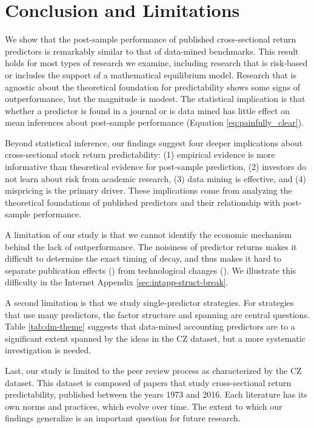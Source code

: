 \section{Conclusion and Limitations}\label{sec:conclusion}

We show that the post-sample performance of published cross-sectional return predictors is remarkably similar to that of data-mined benchmarks. This result holds for most types of research we examine, including research that is risk-based or includes the support of a mathematical equilibrium model. Research that is agnostic about the theoretical foundation for predictability shows some signs of outperformance, but the magnitude is modest. The statistical implication is that whether a predictor is found in a journal or is data mined has little effect on mean inferences about post-sample performance (Equation \eqref{eq:painfully_clear}).

Beyond statistical inference, our findings suggest four deeper implications about cross-sectional stock return predictability: (1) empirical evidence is more informative than theoretical evidence for post-sample prediction, (2) investors do not learn about risk from academic research, (3) data mining is effective, and (4) mispricing is the primary driver. These implications come from analyzing the theoretical foundations of published predictors and their relationship with post-sample performance.

A limitation of our study is that we cannot identify the economic mechanism behind the lack of outperformance. The noisiness of predictor returns makes it difficult to determine the exact timing of decay, and thus makes it hard to separate publication effects (\citealt{mclean2016does}) from technological changes (\citealt{Chordia2014Have}). We illustrate this difficulty in the Internet Appendix \ref{sec:intapp-struct-break}.

A second limitation is that we study single-predictor strategies. For strategies that use many predictors, the factor structure and spanning are central questions. Table \ref{tab:dm-theme} suggests that data-mined accounting predictors are to a significant extent spanned by the ideas in the CZ dataset, but a more systematic investigation is needed. 

Last, our study is limited to the peer review process as characterized by the CZ dataset. This dataset is composed of papers that study cross-sectional return predictability, published between the years 1973 and 2016. Each literature has its own norms and practices, which evolve over time. The extent to which our findings generalize is an important question for future research.

\clearpage

